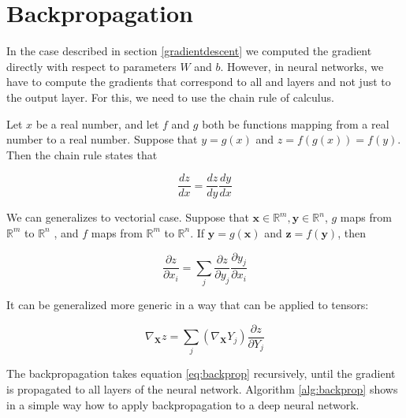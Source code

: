 \section{Backpropagation}
In the case described in section \ref{gradientdescent} we computed the gradient directly with respect to parameters $W$ and $b$. However, in neural networks, we have to compute the gradients that correspond to all and layers and not just to the output layer. For this, we need to use the chain rule of calculus.

Let $x$ be a real number, and let $f$ and $g$ both be functions mapping from a real
number to a real number. Suppose that $y = g(x)$ and $z = f (g(x)) = f (y)$. Then
the chain rule states that


\begin{equation}
\frac{dz}{dx} = \frac{dz}{dy}\frac{dy}{dx}
\end{equation}

We can generalizes to vectorial case. Suppose that $\boldsymbol{x} \in \mathbb{R}^{m} , \boldsymbol{y} \in \mathbb{R}^{n}$, $g$ maps from $\mathbb{R}^{m}$ to $\mathbb{R}^{n}$ , and $f$ maps from $\mathbb{R}^{m}$ to $\mathbb{R}^{n}$. If $\boldsymbol{y} = g(\boldsymbol{x})$ and $\boldsymbol{z} = f( \boldsymbol{y})$, then

\begin{equation}
\frac{\partial{z}}{\partial{x_i}} = \sum_{j} \frac{\partial{z}}{\partial{y_{j}}}\frac{\partial{y_{j}}}{\partial{x_{i}}}
\end{equation}
 
It can be generalized more generic in a way that can be applied to tensors:

\begin{equation}
\nabla_{\textbf{X}}z = \sum_{j}(\nabla_\textbf{X}Y_{j})  \frac{\partial{z}}{\partial{Y_{j}}}
\label{eq:backprop}
\end{equation}

The backpropagation takes equation \ref{eq:backprop} recursively, until the gradient is propagated to all layers of the neural network. Algorithm \ref{alg:backprop} \cite{Goodfellow-et-al-2016} shows in a simple way how to apply backpropagation to a deep neural network.

